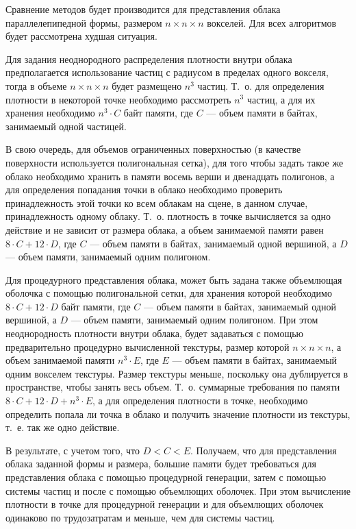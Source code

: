 \label{repr_comp}

Сравнение методов будет производится для представления облака параллелепипедной формы, размером $n\times n \times n$ вокселей. Для всех алгоритмов будет рассмотрена худшая ситуация. 

Для задания неоднородного распределения плотности внутри облака предполагается использование частиц с радиусом в пределах одного вокселя, тогда в объеме $n\times n \times n$ будет размещено $n^3$ частиц. Т.~о. для определения плотности в некоторой точке необходимо рассмотреть $n^3$ частиц, а для их хранения необходимо $n^3 \cdot C$ байт памяти, где $C$ --- объем памяти в байтах, занимаемый одной частицей. 

В свою очередь, для объемов ограниченных поверхностью (в качестве поверхности используется полигональная сетка), для того чтобы задать такое же облако необходимо хранить в памяти восемь верши и двенадцать полигонов, а для определения попадания точки в облако необходимо проверить принадлежность этой точки ко всем облакам на сцене, в данном случае, принадлежность одному облаку. Т.~о. плотность в точке вычисляется за одно действие и не зависит от размера облака, а объем занимаемой памяти равен $8\cdot C + 12 \cdot D$, где $C$ --- объем памяти в байтах, занимаемый одной вершиной, а $D$ --- объем памяти, занимаемый одним полигоном.

Для процедурного представления облака, может быть задана также объемлющая оболочка с помощью полигональной сетки, для хранения которой необходимо $8\cdot C + 12 \cdot D$ байт памяти, где $C$ --- объем памяти в байтах, занимаемый одной вершиной, а $D$ --- объем памяти, занимаемый одним полигоном. При этом неоднородность плотности внутри облака, будет задаваться с помощью предварительно процедурно вычисленной текстуры, размер которой $n\times n \times n$, а объем занимаемой памяти $n^3 \cdot E$, где $E$ --- объем памяти в байтах, занимаемый одним вокселем текстуры. Размер текстуры меньше, поскольку она дублируется в пространстве, чтобы занять весь объем. Т.~о. суммарные требования по памяти $8\cdot C + 12 \cdot D + n^3 \cdot E$, а для определения плотности в точке, необходимо определить попала ли точка в облако и получить значение плотности из текстуры, т.~е. так же одно действие. 

В результате, с учетом того, что $D < C < E$. Получаем, что для представления облака заданной формы и размера, большие памяти будет требоваться для представления облака с помощью процедурной генерации, затем с помощью системы частиц и после с помощью объемлющих оболочек. При этом вычисление плотности в точке для процедурной генерации и для объемлющих оболочек одинаково по трудозатратам и меньше, чем для системы частиц.

